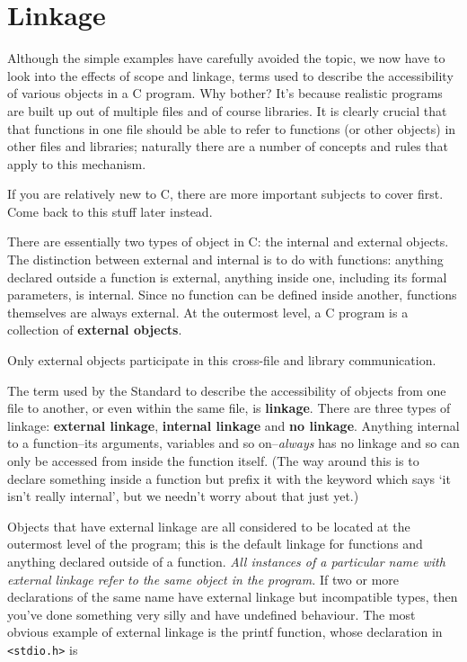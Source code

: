 

        \section{Linkage}
        

  

  Although the simple examples have carefully avoided the topic, we now
   have to look into the effects of scope and linkage, terms used to
   describe the accessibility of various objects in a C program. Why bother?
   It's because realistic programs are built up out of multiple files and of
   course libraries. It is clearly crucial that that functions in one file
   should be able to refer to functions (or other objects) in other files
   and libraries; naturally there are a number of concepts and rules that
   apply to this mechanism.


  If you are relatively new to C, there are more important subjects to
   cover first. Come back to this stuff later instead.


  There are essentially two types of object in C: the internal and
   external objects. The distinction between external and internal is to do
   with functions: anything declared outside a function is external,
   anything inside one, including its formal parameters, is internal. Since
   no function can be defined inside another, functions themselves are
   always external. At the outermost level, a C program is a collection of
   \textbf{external objects}.


  Only external objects participate in this cross-file and library
   communication.


  The term used by the Standard to describe the accessibility of objects
   from one file to another, or even within the same file, is
   \textbf{linkage}. There are three types of linkage: \textbf{external
   linkage}, \textbf{internal linkage} and \textbf{no linkage}.
   Anything internal to a function--its arguments, variables and so
   on--\textit{always} has no linkage and so can only be accessed from
   inside the function itself. (The way around this is to declare something
   inside a function but prefix it with the keyword \extern{}
   which says `it isn't really internal', but we needn't worry about
   that just yet.)


  Objects that have external linkage are all considered to be located at
   the outermost level of the program; this is the default linkage for
   functions and anything declared outside of a function. \textit{All instances
    of a particular name with external linkage refer to the same object in
    the program.} If two or more declarations of the same name have
   external linkage but incompatible types, then you've done something very
   silly and have undefined behaviour. The most obvious example of external
   linkage is the printf function, whose declaration in
   \texttt{<stdio.h>} is


